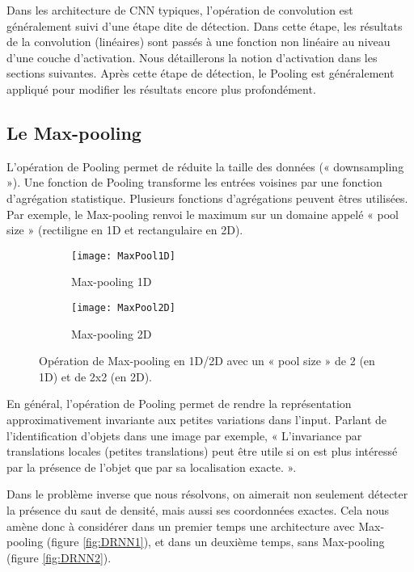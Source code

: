 Dans les architecture de CNN typiques, l'opération de convolution est généralement suivi d'une étape dite de détection. Dans cette étape, les résultats de la convolution (linéaires) sont passés à une fonction non linéaire au niveau d'une couche d'activation. Nous détaillerons la notion d'activation dans les sections suivantes. Après cette étape de détection, le Pooling est généralement appliqué pour modifier les résultats encore plus profondément.

\subsection{Le Max-pooling}
\label{subsec:MaxPoling}
L'opération de Pooling permet de réduite la taille des données (« downsampling »). Une fonction de Pooling transforme les entrées voisines par une fonction d'agrégation statistique. Plusieurs fonctions d'agrégations peuvent êtres utilisées. Par exemple, le Max-pooling renvoi le maximum sur un domaine appelé « pool size » (rectiligne en 1D et rectangulaire en 2D). 


\begin{figure}[!h]
\begin{subfigure}{.5\textwidth}
  \centering
  \texttt{[image: MaxPool1D]}  
  \caption[MaxPool1D]{Max-pooling 1D}
\end{subfigure}
\begin{subfigure}{.5\textwidth}
  \centering
  \texttt{[image: MaxPool2D]}  
  \caption[MaxPool2D]{Max-pooling 2D}
\end{subfigure}
\label{fig:MaxPool1D2D}

\centering
\decoRule
\caption[MaxPoling]{Opération de Max-pooling en 1D/2D avec un « pool size » de 2 (en 1D) et de 2x2 (en 2D).}
\end{figure}


En général, l'opération de Pooling permet de rendre la représentation approximativement invariante aux petites variations dans l'input. Parlant de l'identification d'objets dans une image par exemple, « L'invariance par translations locales (petites translations) peut être utile si on est plus intéressé par la présence de l'objet que par sa localisation exacte. »\parencite[330]{Reference5}.

Dans le problème inverse que nous résolvons, on aimerait non seulement détecter la présence du saut de densité, mais aussi ses coordonnées exactes. Cela nous amène donc à considérer dans un premier temps une architecture avec Max-pooling (figure \ref{fig:DRNN1}), et dans un deuxième temps, sans Max-pooling (figure \ref{fig:DRNN2}).
 
